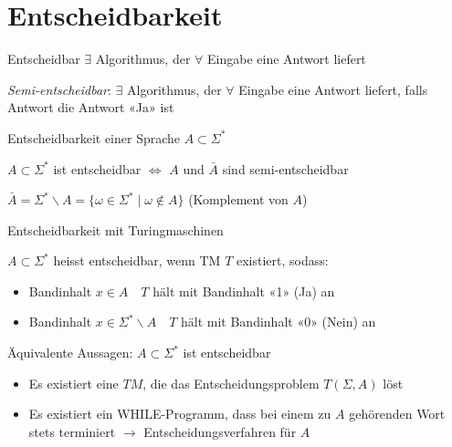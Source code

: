 \graphicspath{{images/}}

\section*{Entscheidbarkeit}

\begin{definition}{Entscheidbar} $\exists$ Algorithmus, der $\forall$ Eingabe eine Antwort liefert
        
        \emph{Semi-entscheidbar}: $\exists$ Algorithmus, der $\forall$ Eingabe eine Antwort liefert, falls Antwort die Antwort «Ja» ist
    
\end{definition}

\begin{theorem}{Entscheidbarkeit} einer Sprache $A \subset \Sigma^{*}$

    $A \subset \Sigma^{*}$ ist entscheidbar $\Leftrightarrow$ $A$ und $\bar{A}$ sind semi-entscheidbar

    \vspace{1mm}

    {\small $\bar{A}=\Sigma^{*} \backslash A=\{\omega \in \Sigma^{*} \mid \omega \notin A\}$ (Komplement von $A$)}

\end{theorem}

\begin{concept}{Entscheidbarkeit mit Turingmaschinen}

    $A \subset \Sigma^{*}$ heisst entscheidbar, wenn TM $T$ existiert, sodass:
    \begin{itemize}
    \item Bandinhalt $x \in A \quad T$ hält mit Bandinhalt «1» (Ja) an
    \item Bandinhalt $x \in \Sigma^{*} \backslash A \quad T$ hält mit Bandinhalt «0» (Nein) an
    \end{itemize}

    \vspace{1mm}

    {\small
    Äquivalente Aussagen: $A \subset \Sigma^{*}$ ist entscheidbar
    \begin{itemize}
        \item Es existiert eine $T M$, die das Entscheidungsproblem $T(\Sigma, A)$ löst
        \item Es existiert ein WHILE-Programm, dass bei einem zu $A$ gehörenden Wort stets terminiert $\rightarrow$ Entscheidungsverfahren für $A$
    \end{itemize}
    }
\end{concept}

